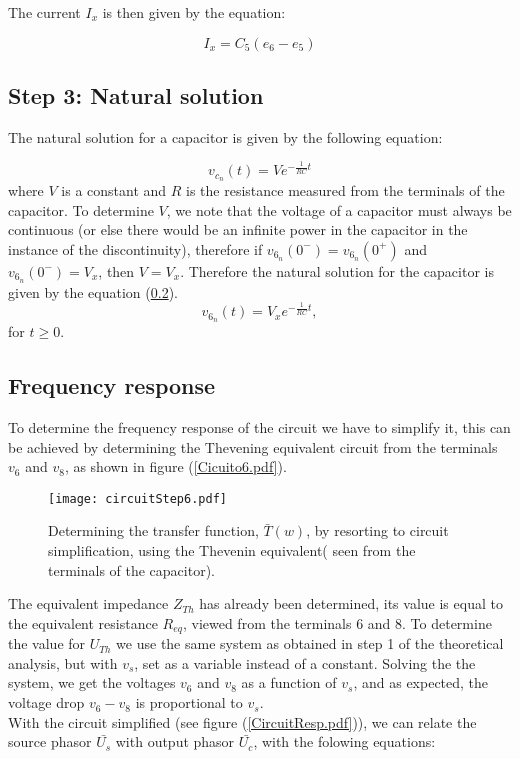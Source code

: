 The current $I_x$ is then given by the equation:

\begin{equation}
    I_x = C_5(e_6-e_5) 
\end{equation}

\subsection{Step 3: Natural solution}
The natural solution for a capacitor is given by the following equation:

\begin{equation}
    v_{c_n}(t) = V e^{-\frac{1}{RC}t}
\end{equation}
where $V$ is a constant and $R$ is the resistance measured from the terminals of the capacitor.
To determine $V$, we note that the voltage of a capacitor must always be continuous (or else there would be an infinite power in the capacitor in the instance of the discontinuity), therefore if $v_{6_n}(0^-) = v_6_n(0^+)$ and  $v_{6_n}(0^-) = V_x$, then $V = V_x$. 
Therefore the natural solution for the capacitor is given by the equation (\ref{}).
\begin{equation}
    v_{6_n}(t) = V_x e^{-\frac{1}{RC}t}, 
\end{equation}
for $t \geq 0$.


\subsection{Frequency response}
To determine the frequency response of the circuit we have to simplify it, this can be achieved by determining the Thevening equivalent circuit from the terminals $v_6$ and $v_8$, as shown in figure (\ref{Cicuito6.pdf}).

\begin{figure}[H] \centering
  \texttt{[image: circuitStep6.pdf]}
  \caption{Determining the transfer function, $\bar{T}(w)$, by resorting to circuit simplification, using the Thevenin equivalent( seen from the terminals of the capacitor).}
  \label{fig:mesh}
\end{figure}



The equivalent impedance $Z_{Th}$ has already been determined, its value is equal to the equivalent resistance $R_{eq}$, viewed from the terminals 6 and 8. To determine the value for $U_{Th}$ we use the same system as obtained in step 1 of the theoretical analysis, but with $v_s$, set as a variable instead of a constant. Solving the the system, we get the voltages $v_6$ and $v_8$ as a function of $v_s$, and as expected, the voltage drop $v_6 - v_8$ is proportional to $v_s$.
\\ With the circuit simplified (see figure (\ref{CircuitResp.pdf})), we can relate the source phasor $\bar{U_s}$ with output phasor $\bar{U_c}$, with the folowing equations:

